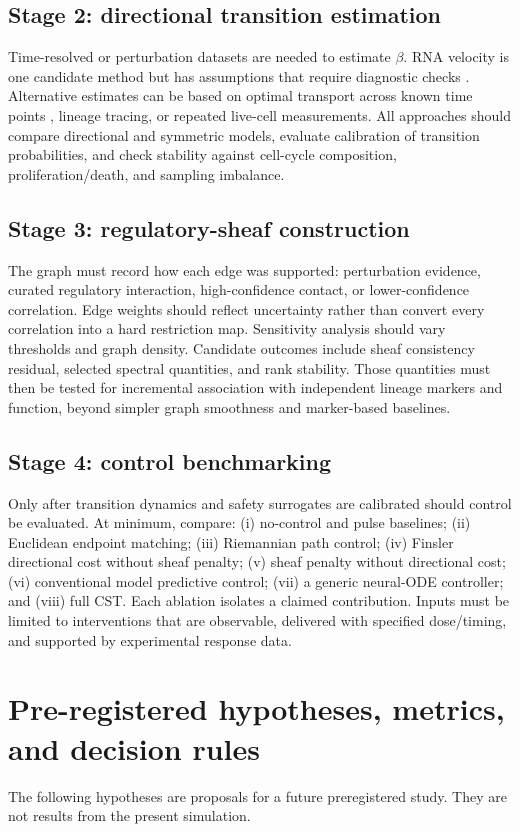 \documentclass[11pt,a4paper]{article}
\theoremstyle{definition}
\theoremstyle{remark}
\begin{document}
\subsection{Stage 2: directional transition estimation}
Time-resolved or perturbation datasets are needed to estimate $\beta$. RNA velocity is one candidate method but has assumptions that require diagnostic checks \cite{LaManno2018,scVelo2020}. Alternative estimates can be based on optimal transport across known time points \cite{Schiebinger2019}, lineage tracing, or repeated live-cell measurements. All approaches should compare directional and symmetric models, evaluate calibration of transition probabilities, and check stability against cell-cycle composition, proliferation/death, and sampling imbalance.

\subsection{Stage 3: regulatory-sheaf construction}
The graph must record how each edge was supported: perturbation evidence, curated regulatory interaction, high-confidence contact, or lower-confidence correlation. Edge weights should reflect uncertainty rather than convert every correlation into a hard restriction map. Sensitivity analysis should vary thresholds and graph density. Candidate outcomes include sheaf consistency residual, selected spectral quantities, and rank stability. Those quantities must then be tested for incremental association with independent lineage markers and function, beyond simpler graph smoothness and marker-based baselines.

\subsection{Stage 4: control benchmarking}
Only after transition dynamics and safety surrogates are calibrated should control be evaluated. At minimum, compare: (i) no-control and pulse baselines; (ii) Euclidean endpoint matching; (iii) Riemannian path control; (iv) Finsler directional cost without sheaf penalty; (v) sheaf penalty without directional cost; (vi) conventional model predictive control; (vii) a generic neural-ODE controller; and (viii) full CST. Each ablation isolates a claimed contribution. Inputs must be limited to interventions that are observable, delivered with specified dose/timing, and supported by experimental response data.

\section{Pre-registered hypotheses, metrics, and decision rules}
The following hypotheses are proposals for a future preregistered study. They are not results from the present simulation.
\end{document}
